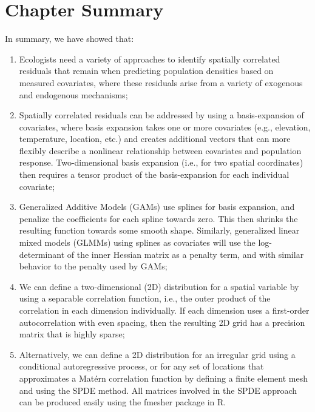 \section{Chapter Summary}

In summary, we have showed that:
\begin{enumerate}
    \item Ecologists need a variety of approaches to identify spatially correlated residuals that remain when predicting population densities based on measured covariates, where these residuals arise from a variety of exogenous and endogenous mechanisms;

    \item Spatially correlated residuals can be addressed by using a basis-expansion of covariates, where basis expansion takes one or more covariates (e.g., elevation, temperature, location, etc.) and creates additional vectors that can more flexibly describe a nonlinear relationship between covariates and population response.  Two-dimensional basis expansion (i.e., for two spatial coordinates) then requires a tensor product of the basis-expansion for each individual covariate;
    
    \item Generalized Additive Models (GAMs) use splines for basis expansion, and penalize the coefficients for each spline towards zero.  This then shrinks the resulting function towards some smooth shape.  Similarly, generalized linear mixed models (GLMMs) using splines as covariates will use the log-determinant of the inner Hessian matrix as a penalty term, and with similar behavior to the penalty used by GAMs;
    
    \item We can define a two-dimensional (2D) distribution for a spatial variable by using a separable correlation function, i.e., the outer product of the correlation in each dimension individually. If each dimension uses a first-order autocorrelation with even spacing, then the resulting 2D grid has a precision matrix that is highly sparse;
    
    \item Alternatively, we can define a 2D distribution for an irregular grid using a conditional autoregressive process, or for any set of locations that approximates a Matérn correlation function by defining a finite element mesh and using the SPDE method.  All matrices involved in the SPDE approach can be produced easily using the fmesher package in R.  
\end{enumerate}

